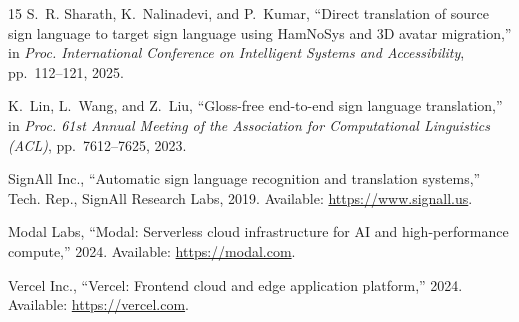 \documentclass[11pt, a4paper]{article}
\begin{document}
\begin{thebibliography}{15}
S.~R. Sharath, K.~Nalinadevi, and P.~Kumar, ``Direct translation of source sign language to target sign language using HamNoSys and 3D avatar migration,'' in \textit{Proc. International Conference on Intelligent Systems and Accessibility}, pp.~112--121, 2025.

K.~Lin, L.~Wang, and Z.~Liu, ``Gloss-free end-to-end sign language translation,'' in \textit{Proc. 61st Annual Meeting of the Association for Computational Linguistics (ACL)}, pp.~7612--7625, 2023.

SignAll Inc., ``Automatic sign language recognition and translation systems,'' Tech. Rep., SignAll Research Labs, 2019. Available: \url{https://www.signall.us}.

Modal Labs, ``Modal: Serverless cloud infrastructure for AI and high-performance compute,'' 2024. Available: \url{https://modal.com}.

Vercel Inc., ``Vercel: Frontend cloud and edge application platform,'' 2024. Available: \url{https://vercel.com}.

\end{thebibliography}
\end{document}

